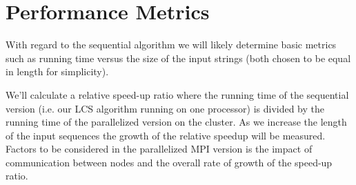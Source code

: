 \section{Performance Metrics}
\label{sec:metrics}
With regard to the sequential algorithm we will likely determine basic metrics such as running time versus the size of the input strings (both chosen to be equal in length for simplicity).

We'll calculate a relative speed-up ratio where the running time of the sequential version (i.e. our LCS algorithm running on one processor) is divided by the running time of the parallelized version on the cluster. As we increase the length of the input sequences the growth of the relative speedup will be measured. Factors to be considered in the parallelized MPI version is the impact of communication between nodes and the overall rate of growth of the speed-up ratio.
